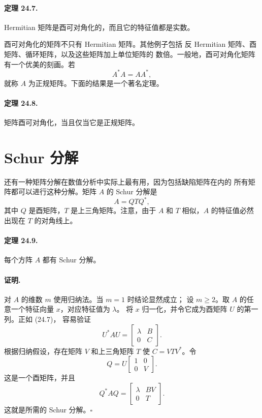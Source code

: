 \documentclass[UTF8,fontset=none,12pt]{ctexart}
\begin{document}
\paragraph{定理 24.7.}
Hermitian 矩阵是酉可对角化的，而且它的特征值都是实数。

酉可对角化的矩阵不只有 Hermitian 矩阵。其他例子包括
反 Hermitian 矩阵、酉矩阵、循环矩阵，以及这些矩阵加上单位矩阵的
数倍。一般地，酉可对角化矩阵有一个优美的刻画。若
\[
A^*A=AA^*,
\]
就称 $A$ 为正规矩阵。下面的结果是一个著名定理。

\paragraph{定理 24.8.}
矩阵酉可对角化，当且仅当它是正规矩阵。

\section*{Schur 分解}

还有一种矩阵分解在数值分析中实际上最有用，因为包括缺陷矩阵在内的
所有矩阵都可以进行这种分解。矩阵 $A$ 的 Schur 分解是
\begin{equation}
A=QTQ^*,
\tag{24.10}
\end{equation}
其中 $Q$ 是酉矩阵，$T$ 是上三角矩阵。注意，由于 $A$ 和 $T$
相似，$A$ 的特征值必然出现在 $T$ 的对角线上。

\paragraph{定理 24.9.}
每个方阵 $A$ 都有 Schur 分解。

\paragraph{证明.}
对 $A$ 的维数 $m$ 使用归纳法。当 $m=1$ 时结论显然成立；
设 $m\ge2$。取 $A$ 的任意一个特征向量 $x$，对应特征值为 $\lambda$。
将 $x$ 归一化，并令它成为酉矩阵 $U$ 的第一列。正如 (24.7)，
容易验证
\[
U^*AU=
\begin{bmatrix}
\lambda&B\\
0&C
\end{bmatrix}.
\]
根据归纳假设，存在矩阵 $V$ 和上三角矩阵 $T$ 使
$C=VTV^*$。令
\[
Q=U
\begin{bmatrix}
1&0\\
0&V
\end{bmatrix}.
\]
这是一个酉矩阵，并且
\[
Q^*AQ=
\begin{bmatrix}
\lambda&BV\\
0&T
\end{bmatrix}.
\]
这就是所需的 Schur 分解。\hfill$\square$
\end{document}
